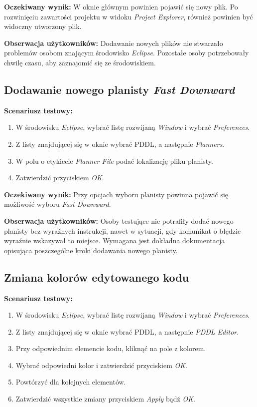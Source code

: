 \textbf{Oczekiwany wynik:} W oknie głównym powinien pojawić się nowy plik. Po rozwinięciu zawartości projektu w widoku \textit{Project Explorer}, również powinien być widoczny utworzony plik.

\textbf{Obserwacja użytkowników:} Dodawanie nowych plików nie stwarzało problemów osobom znającym środowisko \textit{Eclipse}. Pozostałe osoby potrzebowały chwilę czasu, aby zaznajomić się ze środowiskiem.  

\subsection{Dodawanie nowego planisty \textit{Fast Downward}}
\textbf{Scenariusz testowy:}
  \begin{enumerate}
  
\item W środowisku \textit{Eclipse}, wybrać listę rozwijaną \textit{Window} i wybrać \textit{Preferences}.
\item Z listy znajdującej się w oknie wybrać PDDL, a następnie \textit{Planners}.
\item W polu o etykiecie \textit{Planner File} podać lokalizację pliku planisty.
\item Zatwierdzić przyciskiem \textit{OK}.
\end{enumerate}

\textbf{Oczekiwany wynik:} Przy opcjach wyboru planisty powinna pojawić się możliwość wyboru \textit{Fast Downward}.

\textbf{Obserwacja użytkowników:} Osoby testujące nie potrafiły dodać nowego planisty bez wyraźnych instrukcji, nawet w sytuacji, gdy komunikat o błędzie wyraźnie wskazywał to miejsce. Wymagana jest dokładna dokumentacja opisująca poszczególne kroki dodawania nowego planisty. 
\subsection{Zmiana kolorów edytowanego kodu}
\textbf{Scenariusz testowy:}
  \begin{enumerate}
  
\item W środowisku \textit{Eclipse}, wybrać listę rozwijaną \textit{Window} i wybrać \textit{Preferences}.
\item Z listy znajdującej się w oknie wybrać PDDL, a następnie \textit{PDDL Editor}.
\item Przy odpowiednim elemencie kodu, kliknąć na pole z kolorem.
\item Wybrać odpowiedni kolor i zatwierdzić przyciskiem \textit{OK}.
\item Powtórzyć dla kolejnych elementów.
\item Zatwierdzić wszystkie zmiany przyciskiem \textit{Apply} bądź \textit{OK}.

\end{enumerate}

